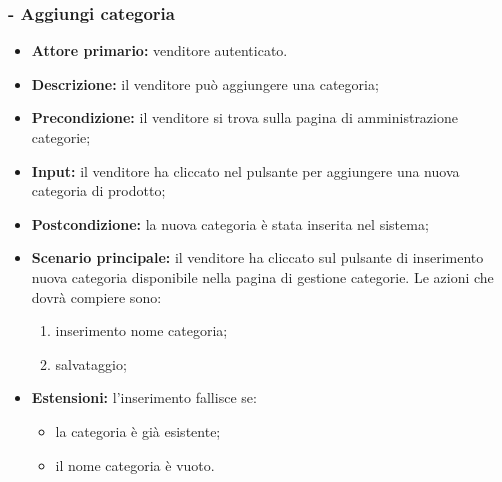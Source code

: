 \subsubsection{- Aggiungi categoria}
\begin{itemize}
    \item \textbf{Attore primario:} venditore autenticato.
    \item \textbf{Descrizione:} il venditore può aggiungere una categoria;
    \item \textbf{Precondizione:} il venditore si trova sulla pagina di amministrazione categorie;
    \item \textbf{Input:} il venditore ha cliccato nel pulsante per aggiungere una nuova categoria di prodotto;
    \item \textbf{Postcondizione:} la nuova categoria è stata inserita nel sistema;
    \item \textbf{Scenario principale:} il venditore ha cliccato sul pulsante di inserimento nuova categoria disponibile nella pagina di gestione categorie. Le azioni che dovrà compiere sono:
          \begin{enumerate}
              \item inserimento nome categoria;
              \item salvataggio;
          \end{enumerate}
    \item \textbf{Estensioni:} l'inserimento fallisce se:
          \begin{itemize}
              \item la categoria è già esistente;
              \item il nome categoria è vuoto.
          \end{itemize}
\end{itemize}

\stepsubUserCase
